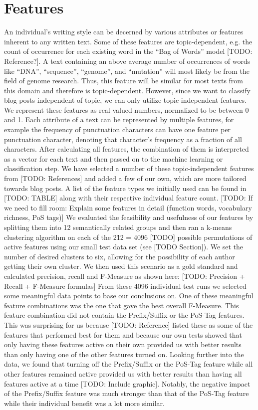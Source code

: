 \section{Features}
\label{sec:feautres}

An individual’s writing style can be decerned by various attributes or features inherent to any written text. Some of these features are topic-dependent, e.g. the count of occurrence for each existing word in the “Bag of Words” model [TODO: Reference?]. A text containing an above average number of occurrences of words like “DNA”, “sequence”, “genome”, and “mutation” will most likely be from the field of genome research. Thus, this feature will be similar for most texts from this domain and therefore is topic-dependent.
However, since we want to classify blog posts independent of topic, we can only utilize topic-independent features. We represent these features as real valued numbers, normalized to be between 0 and 1. Each attribute of a text can be represented by multiple features, for example the frequency of punctuation characters can have one feature per punctuation character, denoting that character’s frequency as a fraction of all characters. After calculating all features, the combination of them is interpreted as a vector for each text and then passed on to the machine learning or classification step.
We have selected a number of these topic-independent features from [TODO: References] and added a few of our own, which are more tailored towards blog posts.
A list of the feature types we initially used can be found in [TODO: TABLE] along with their respective individual feature count.
[TODO: If we need to fill room: Explain some features in detail (function words, vocabulary richness, PoS tags)]
We evaluated the feasibility and usefulness of our features by splitting them into 12 semantically related groups and then ran a k-means clustering algorithm on each of the 2\^12 = 4096 [TODO] possible permutations of active features using our small test data set (see [TODO Section]). We set the number of desired clusters to six, allowing for the possibility of each author getting their own cluster. We then used this scenario as a gold standard and calculated precision, recall and F-Measure as shown here: [TODO: Precision + Recall + F-Measure formulas]
From these 4096 individual test runs we selected some meaningful data points to base our conclusions on. One of these meaningful feature combinations was the one that gave the best overall F-Measure. This feature combination did not contain the Prefix/Suffix or the PoS-Tag features. This was surprising for us because [TODO: Reference] listed these as some of the features that performed best for them and because our own tests showed that only having these features active on their own provided us with better results than only having one of the other features turned on. Looking further into the data, we found that turning off the Prefix/Suffix or the PoS-Tag feature while all other features remained active provided us with better results than having all features active at a time [TODO: Include graphic]. Notably, the negative impact of the Prefix/Suffix feature was much stronger than that of the PoS-Tag feature while their individual benefit was a lot more similar.
